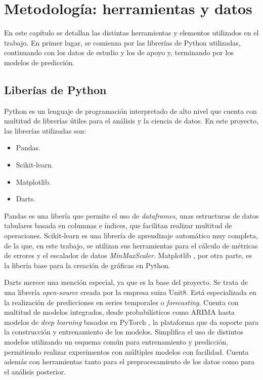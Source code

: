 \chapter{Metodología: herramientas y datos}\label{cap3}

En este capítulo se detallan las distintas herramientas y elementos utilizados en el trabajo. En primer lugar, se comienza por las librerías de Python utilizadas, continuando con los datos de estudio y los de apoyo y, terminando por los modelos de predicción.

\section{Liberías de Python}

Python \cite{python} es un lenguaje de programación interpretado de alto nivel que cuenta con multitud de librerías útiles para el análisis y la ciencia de datos. En este proyecto, las librerías utilizadas son:

\begin{itemize}
	\item Pandas.
	\item Scikit-learn.
	\item Matplotlib.
	\item Darts.
\end{itemize}

Pandas \cite{pandas} es una libería que permite el uso de \textit{dataframes}, unas estructuras de datos tabulares basada en columnas e índices, que facilitan realizar multitud de operaciones. Scikit-learn \cite{scikit-learn} es una librería de aprendizaje automático muy completa, de la que, en este trabajo, se utilizan sus herramientas para el cálculo de métricas de errores y el escalador de datos \textit{MinMaxScaler}. Matplotlib \cite{matplotlib}, por otra parte, es la libería base para la creación de gráficas en Python.

Darts \cite{darts} merece una mención especial, ya que es la base del proyecto. Se trata de una librería \textit{open-source} creada por la empresa suiza Unit8. Está especializada en la realización de predicciones en series temporales o \textit{forecasting}. Cuenta con multitud de modelos integrados, desde probabilísticos como ARIMA hasta modelos de \textit{deep learning} basados en PyTorch \cite{pytorch}, la plataforma que da soporte para la construcción y entrenamiento de los modelos. Simplifica el uso de distintos modelos utilizando un esquema común para entrenamiento y predicción, permitiendo realizar experimentos con múltiples modelos con facilidad. Cuenta además con herramientas tanto para el preprocesamiento de los datos como para el análisis posterior.

